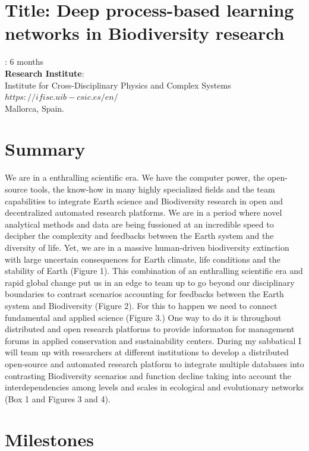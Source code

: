 \documentclass[authoryear,1p,12pt]{elsarticle}
\begin{document}
\section{{\bf Title: Deep process-based learning networks in Biodiversity research}}

: 6 months\\
{\bf Research Institute}:\\ Institute for Cross-Disciplinary
Physics and Complex Systems\\
$https://ifisc.uib-csic.es/en/$\\ Mallorca, Spain.\\


\section{{\bf Summary}}
We are in a enthralling scientific era. We have the computer power,
the open-source tools, the know-how in many highly specialized fields
and the team capabilities to integrate Earth science and Biodiversity
research in open and decentralized automated research platforms. We
are in a period where novel analytical methods and data are being
fussioned at an incredible speed to decipher the complexity and
feedbacks between the Earth system and the diversity of life. Yet, we
are in a massive human-driven biodiversity extinction with large
uncertain consequences for Earth climate, life conditions and the
stability of Earth (Figure 1). This combination of an enthralling
scientific era and rapid global change put us in an edge to team up to
go beyond our disciplinary boundaries to contrast scenarios accounting
for feedbacks between the Earth system and Biodiversity (Figure
2). For this to happen we need to connect fundamental and applied
science (Figure 3.) One way to do it is throughout distributed and
open research platforms to provide informaton for management forums in
applied conservation and sustainability centers. During my sabbatical
I will team up with researchers at different institutions to develop a
distributed open-source and automated research platform to integrate
multiple databases into contrasting Biodiversity scenarios and
function decline taking into account the interdependencies among
levels and scales in ecological and evolutionary networks (Box 1 and
Figures 3 and 4).


\section{{\bf Milestones}}
\end{document}
